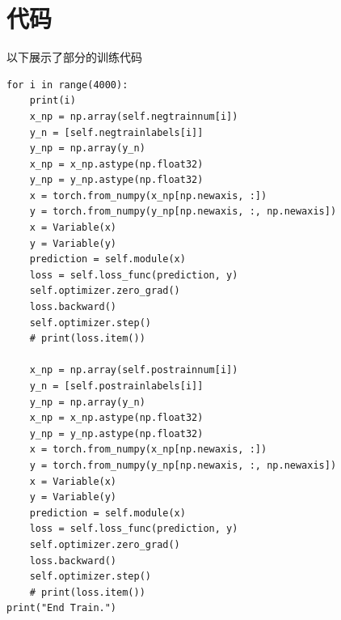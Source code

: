 \documentclass[12pt, a4paper]{report}
\begin{document}
\section{代码}

以下展示了部分的训练代码
\small
\begin{verbatim}
for i in range(4000):
    print(i)
    x_np = np.array(self.negtrainnum[i])
    y_n = [self.negtrainlabels[i]]
    y_np = np.array(y_n)
    x_np = x_np.astype(np.float32)
    y_np = y_np.astype(np.float32)
    x = torch.from_numpy(x_np[np.newaxis, :])
    y = torch.from_numpy(y_np[np.newaxis, :, np.newaxis])
    x = Variable(x)
    y = Variable(y)
    prediction = self.module(x)
    loss = self.loss_func(prediction, y)
    self.optimizer.zero_grad()
    loss.backward()
    self.optimizer.step()
    # print(loss.item())

    x_np = np.array(self.postrainnum[i])
    y_n = [self.postrainlabels[i]]
    y_np = np.array(y_n)
    x_np = x_np.astype(np.float32)
    y_np = y_np.astype(np.float32)
    x = torch.from_numpy(x_np[np.newaxis, :])
    y = torch.from_numpy(y_np[np.newaxis, :, np.newaxis])
    x = Variable(x)
    y = Variable(y)
    prediction = self.module(x)
    loss = self.loss_func(prediction, y)
    self.optimizer.zero_grad()
    loss.backward()
    self.optimizer.step()
    # print(loss.item())
print("End Train.")
\end{verbatim}
\normalsize
\end{document}
